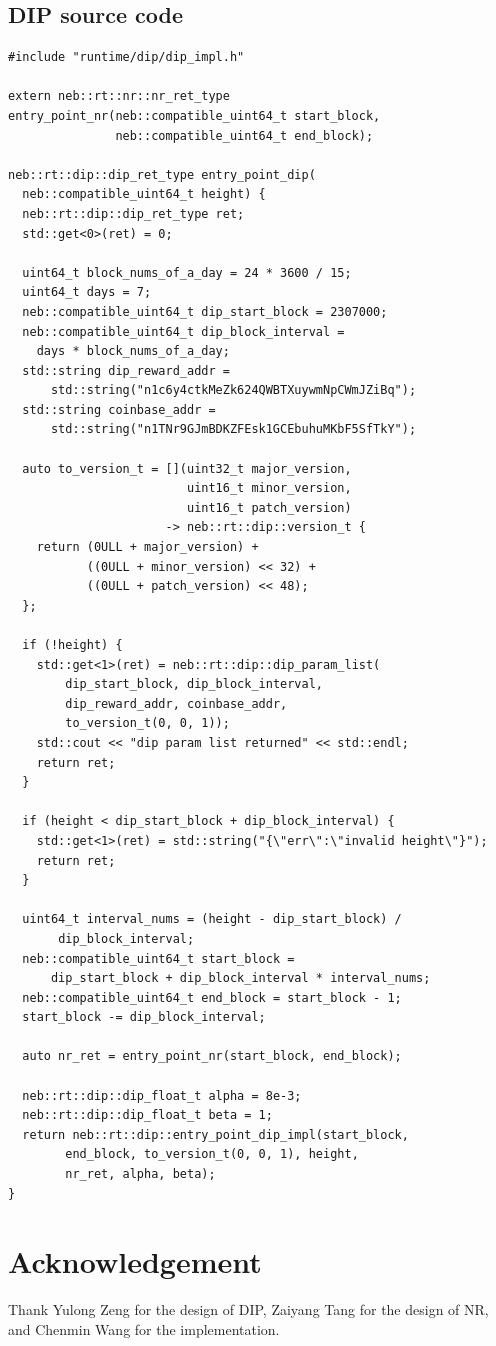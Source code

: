 \documentclass[11pt]{article}
\begin{document}
\subsection{DIP source code}
\begin{lstlisting}
#include "runtime/dip/dip_impl.h"

extern neb::rt::nr::nr_ret_type
entry_point_nr(neb::compatible_uint64_t start_block,
               neb::compatible_uint64_t end_block);

neb::rt::dip::dip_ret_type entry_point_dip(
  neb::compatible_uint64_t height) {
  neb::rt::dip::dip_ret_type ret;
  std::get<0>(ret) = 0;

  uint64_t block_nums_of_a_day = 24 * 3600 / 15;
  uint64_t days = 7;
  neb::compatible_uint64_t dip_start_block = 2307000;
  neb::compatible_uint64_t dip_block_interval =
    days * block_nums_of_a_day;
  std::string dip_reward_addr =
      std::string("n1c6y4ctkMeZk624QWBTXuywmNpCWmJZiBq");
  std::string coinbase_addr =
      std::string("n1TNr9GJmBDKZFEsk1GCEbuhuMKbF5SfTkY");

  auto to_version_t = [](uint32_t major_version,
                         uint16_t minor_version,
                         uint16_t patch_version)
                      -> neb::rt::dip::version_t {
    return (0ULL + major_version) +
           ((0ULL + minor_version) << 32) +
           ((0ULL + patch_version) << 48);
  };

  if (!height) {
    std::get<1>(ret) = neb::rt::dip::dip_param_list(
        dip_start_block, dip_block_interval,
        dip_reward_addr, coinbase_addr,
        to_version_t(0, 0, 1));
    std::cout << "dip param list returned" << std::endl;
    return ret;
  }

  if (height < dip_start_block + dip_block_interval) {
    std::get<1>(ret) = std::string("{\"err\":\"invalid height\"}");
    return ret;
  }

  uint64_t interval_nums = (height - dip_start_block) /
       dip_block_interval;
  neb::compatible_uint64_t start_block =
      dip_start_block + dip_block_interval * interval_nums;
  neb::compatible_uint64_t end_block = start_block - 1;
  start_block -= dip_block_interval;

  auto nr_ret = entry_point_nr(start_block, end_block);

  neb::rt::dip::dip_float_t alpha = 8e-3;
  neb::rt::dip::dip_float_t beta = 1;
  return neb::rt::dip::entry_point_dip_impl(start_block,
        end_block, to_version_t(0, 0, 1), height,
        nr_ret, alpha, beta);
}
\end{lstlisting}


\section{Acknowledgement}
Thank Yulong Zeng for the design of DIP, Zaiyang Tang for the design of NR, and
Chenmin Wang for the implementation.
\end{document}
